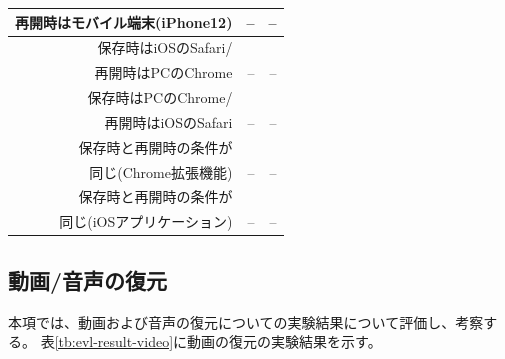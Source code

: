 \begin{table}[htbp]
\begin{center}
\begin{tabular}{rrr}
      再開時はモバイル端末(iPhone12) & -- & -- \\ \hline
      保存時はiOSのSafari/\\
      再開時はPCのChrome & -- & -- \\ \hline
      保存時はPCのChrome/\\
      再開時はiOSのSafari & -- & -- \\ \hline
      保存時と再開時の条件が\\
      同じ(Chrome拡張機能) & -- & -- \\ \hline
      保存時と再開時の条件が\\
      同じ(iOSアプリケーション) & -- & -- \\ \hline
    \end{tabular}
  \end{center}
\end{table}

\subsection{動画/音声の復元}
本項では、動画および音声の復元についての実験結果について評価し、考察する。
表\ref{tb:evl-result-video}に動画の復元の実験結果を示す。

